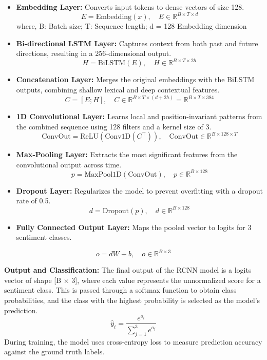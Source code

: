 \documentclass{article}
\begin{document}
\begin{itemize}
\item \textbf{Embedding Layer:} Converts input tokens to dense vectors of size 128.
\[
E = \text{Embedding}(x), \quad E \in \mathbb{R}^{B \times T \times d}
\]
where, B: Batch size; T: Sequence length; d = 128 Embedding dimension

\item \textbf{Bi-directional LSTM Layer:} Captures context from both past and future directions, resulting in a 256-dimensional output.
\[
H = \text{BiLSTM}(E), \quad H \in \mathbb{R}^{B \times T \times 2h}
\]

\item \textbf{Concatenation Layer:} Merges the original embeddings with the BiLSTM outputs, combining shallow lexical and deep contextual features. 
\[
C = [E; H], \quad C \in \mathbb{R}^{B \times T \times (d + 2h)} = \mathbb{R}^{B \times T \times 384}
\]

\item \textbf{1D Convolutional Layer:} Learns local and position-invariant patterns from the combined sequence using 128 filters and a kernel size of 3.
\[
\text{ConvOut} = \text{ReLU}(\text{Conv1D}(C^\top)), \quad \text{ConvOut} \in \mathbb{R}^{B \times 128 \times T}
\]

\item \textbf{Max-Pooling Layer:} Extracts the most significant features from the convolutional output across time.
\[
p = \text{MaxPool1D}(\text{ConvOut}), \quad p \in \mathbb{R}^{B \times 128}
\]

\item \textbf{Dropout Layer:} Regularizes the model to prevent overfitting with a dropout rate of 0.5.
\[
d = \text{Dropout}(p), \quad d \in \mathbb{R}^{B \times 128}
\]

\item \textbf{Fully Connected Output Layer:} Maps the pooled vector to logits for 3 sentiment classes.
\end{itemize}
\[
o = dW + b, \quad o \in \mathbb{R}^{B \times 3}
\]


\textbf{Output and Classification:}
The final output of the RCNN model is a logits vector of shape [B × 3], where each value represents the unnormalized score for a sentiment class. This is passed through a softmax function to obtain class probabilities, and the class with the highest probability is selected as the model's prediction. 
\[
\hat{y}_i = \frac{e^{o_i}}{\sum_{j=1}^{3} e^{o_j}}
\]
During training, the model uses cross-entropy loss to measure prediction accuracy against the ground truth labels.
\end{document}

